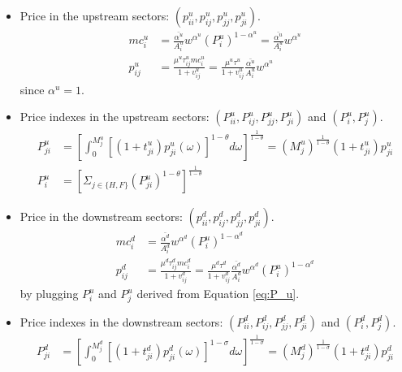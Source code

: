 \documentclass{homeworg}
\begin{document}
\begin{itemize}[ref=Step , wide=0pt]
\item Price in the upstream sectors: $(p^{u}_{ii}, p^{u}_{ij}, p^{u}_{jj}, p^{u}_{ji})$.
\begin{equation}
\begin{aligned}
\label{eq:p_u}
mc^{u}_{i} &= \frac{\bar{\alpha^{u}}}{A^{u}_{i}}w^{\alpha^{u}}(P^{u}_{i})^{1-\alpha^{u}} = \frac{\bar{\alpha^{u}}}{A^{u}_{i}}w^{\alpha^{u}} \\
p^{u}_{ij} &= \frac{\mu^{u}\tau^{u}_{ij}mc^{u}_{i}}{1+v^{u}_{ij}} = \frac{\mu^{u}\tau^{u}}{1+v^{u}_{ij}}\frac{\bar{\alpha^{u}}}{A^{u}_{i}}w^{\alpha^{u}}
\end{aligned}
\end{equation}
since $\alpha^{u}=1$.
\item Price indexes in the upstream sectors: $(P^{u}_{ii}, P^{u}_{ij}, P^{u}_{jj}, P^{u}_{ji})$ and $(P^{u}_{i}, P^{u}_{j})$.
\begin{equation}
\begin{aligned}
\label{eq:P_u}
P^{u}_{ji} &= [\int_{0}^{M^{u}_{j}}[(1+t^{u}_{ji})p^{u}_{ji}(\omega)]^{1-\theta}d\omega]^{\frac{1}{1-\theta}} = (M^{u}_{j})^{\frac{1}{1-\theta}}(1+t^{u}_{ji})p^{u}_{ji} \\
P^{u}_{i} &= [\Sigma_{j\in\{H, F\}}(P^{u}_{ji})^{1-\theta}]^{\frac{1}{1-\theta}}
\end{aligned}
\end{equation}
\item Price in the downstream sectors: $(p^{d}_{ii}, p^{d}_{ij}, p^{d}_{jj}, p^{d}_{ji})$.
\begin{equation}
\begin{aligned}
\label{eq:p_d}
mc^{d}_{i} &= \frac{\bar{\alpha^{d}}}{A^{d}_{i}}w^{\alpha^{d}}(P^{u}_{i})^{1-\alpha^{d}}\\
p^{d}_{ij} &= \frac{\mu^{d}\tau^{d}_{ij}mc^{d}_{i}}{1+v^{d}_{ij}} = \frac{\mu^{d}\tau^{d}}{1+v^{d}_{ij}}\frac{\bar{\alpha^{d}}}{A^{d}_{i}}w^{\alpha^{d}}(P^{u}_{i})^{1-\alpha^{d}}
\end{aligned}
\end{equation}
by plugging $P^{u}_{i}$ and $P^{u}_{j}$ derived from Equation \ref{eq:P_u}.
\item Price indexes in the downstream sectors: $(P^{d}_{ii}, P^{d}_{ij}, P^{d}_{jj}, P^{d}_{ji})$ and $(P^{d}_{i}, P^{d}_{j})$.
\begin{equation}
\begin{aligned}
\label{eq:P_d}
P^{d}_{ji} &= [\int_{0}^{M^{d}_{j}}[(1+t^{d}_{ji})p^{d}_{ji}(\omega)]^{1-\sigma}d\omega]^{\frac{1}{1-\sigma}} = (M^{d}_{j})^{\frac{1}{1-\sigma}}(1+t^{d}_{ji})p^{d}_{ji} \\

\end{aligned}
\end{equation}
\end{itemize}
\end{document}
